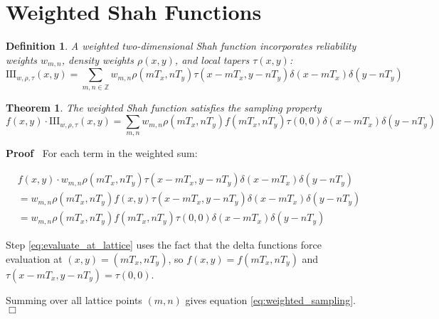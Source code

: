 \documentclass{article}
\newenvironment{proof}{\noindent\textbf{Proof\ }}{\hspace*{\fill}$\Box$\medskip}
\newtheorem{definition}{Definition}
\newtheorem{theorem}{Theorem}
\begin{document}
\section{Weighted Shah Functions}

\begin{definition}
  \label{def:weighted_shah}A weighted two-dimensional Shah function
  incorporates reliability weights $w_{m, n}$, density weights $\rho (x, y)$,
  and local tapers $\tau (x, y)$:
  \begin{equation}
    \label{eq:weighted_shah} \text{III}_{w, \rho, \tau} (x, y) = \sum_{m, n
    \in \mathbb{Z}} w_{m, n} \rho (mT_x, nT_y) \tau (x - mT_x, y - nT_y)
    \delta (x - mT_x) \delta (y - nT_y)
  \end{equation}
\end{definition}

\begin{theorem}
  \label{thm:weighted_shah_properties}The weighted Shah function satisfies the
  sampling property
  \begin{equation}
    \label{eq:weighted_sampling} f (x, y) \cdot \text{III}_{w, \rho, \tau} (x,
    y) = \sum_{m, n} w_{m, n} \rho (mT_x, nT_y) f (mT_x, nT_y) \tau (0, 0)
    \delta (x - mT_x) \delta (y - nT_y)
  \end{equation}
\end{theorem}

\begin{proof}
  For each term in the weighted sum:
  
  \begin{align}
    & f (x, y) \cdot w_{m, n} \rho (mT_x, nT_y) \tau (x - mT_x, y - nT_y)
    \delta (x - mT_x) \delta (y - nT_y) \nonumber\\
    & = w_{m, n} \rho (mT_x, nT_y) f (x, y) \tau (x - mT_x, y - nT_y) \delta
    (x - mT_x) \delta (y - nT_y)  \label{eq:rearrange_factors}\\
    & = w_{m, n} \rho (mT_x, nT_y) f (mT_x, nT_y) \tau (0, 0) \delta (x -
    mT_x) \delta (y - nT_y)  \label{eq:evaluate_at_lattice}
  \end{align}
  
  Step \eqref{eq:evaluate_at_lattice} uses the fact that the delta functions
  force evaluation at $(x, y) = (mT_x, nT_y)$, so $f (x, y) = f (mT_x, nT_y)$
  and $\tau (x - mT_x, y - nT_y) = \tau (0, 0)$.
  
  Summing over all lattice points $(m, n)$ gives equation
  \eqref{eq:weighted_sampling}.
\end{proof}
\end{document}
